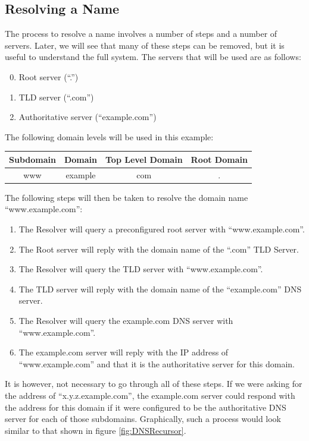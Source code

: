 \documentclass[a4paper,11pt]{report}
\begin{document}
		\subsection{Resolving a Name}
			The process to resolve a name involves a number of steps and a number of servers. 
			Later, we will see that many of these steps can be removed, but it is useful to understand the full system. 
			The servers that will be used are as follows:
			\begin{enumerate}
				\setcounter{enumi}{-1}
				\item Root server (``.'')
				\item TLD server (``.com'')
				\item Authoritative server (``example.com'')
			\end{enumerate}
			The following domain levels will be used in this example:
			\begin{center}
				\begin{tabular}{| c | c | c | c |}
					\hline
					\textbf{Subdomain} & \textbf{Domain} & \textbf{Top Level Domain} & \textbf{Root Domain} \\ \hline
					www & example & com & . \\ \hline
				\end{tabular}
			\end{center}
			The following steps will then be taken to resolve the domain name ``www.example.com'':
			\begin{enumerate}
				\item The Resolver will query a preconfigured root server with ``www.example.com''. 
				\item The Root server will reply with the domain name of the ``.com'' TLD Server.
				\item The Resolver will query the TLD server with ``www.example.com''.
				\item The TLD server will reply with the domain name of the ``example.com'' DNS server. 
				\item The Resolver will query the example.com DNS server with ``www.example.com''. 
				\item The example.com server will reply with the IP address of ``www.example.com'' and that it is the authoritative server for this domain. 
			\end{enumerate}
			It is however, not necessary to go through all of these steps. 
			If we were asking for the address of ``x.y.z.example.com'', the example.com server could respond with the address for this domain if it were configured to be the authoritative DNS server for each of those subdomains. 
			Graphically, such a process would look similar to that shown in figure \ref{fig:DNSRecursor}.
\end{document}
